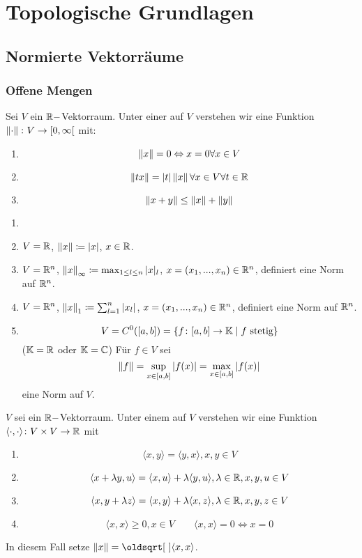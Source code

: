 \chapter{Topologische Grundlagen}
\section{Normierte Vektorr\"aume}
\subsection{Offene Mengen}
\begin{definition}
	Sei $ V $ ein $ \mathbb{R}- $Vektorraum. Unter einer  auf $ V $ verstehen wir eine Funktion $ \left\|\cdot\right\|\colon V\rightarrow [0,\infty[ $ mit:
	\begin{enumerate}
		\item[(N1)] \[ \left\|x\right\|=0\Leftrightarrow x=0\forall x\in V \]
		\item[(N2)] \[ \left\|tx\right\|=|t|\left\|x\right\|\forall x\in V\forall t\in\mathbb{R} \]
		\item[(N3)] \[ \left\|x+y\right\|\leq\left\|x\right\|+\left\|y\right\| \]
	\end{enumerate}
\end{definition}
\begin{beispiel*}
	\begin{enumerate}
		\item[]
		\item $ V=\mathbb{R} $, $ \left\|x\right\|\coloneqq|x| $, $ x\in\mathbb{R} $.
		\item $ V=\mathbb{R}^n $, $ \left\|x\right\|_\infty\coloneqq\max_{1\leq l\leq n}|x|_l $, $ x=(x_1,...,x_n)\in\mathbb{R}^n $, definiert eine Norm auf $ \mathbb{R}^n $.
		\item $ V=\mathbb{R}^n $, $ \left\|x\right\|_1\coloneqq\sum_{l=1}^n|x_l| $, $ x=(x_1,...,x_n)\in\mathbb{R}^n $, definiert eine Norm auf $ \mathbb{R}^n $.
		\item \[ V=C^0([a,b])=\lbrace f\colon[a,b]\rightarrow\mathbb{K}\mid f\text{ stetig}\rbrace \]
		($ \mathbb{K}=\mathbb{R} $ oder $ \mathbb{K}=\mathbb{C} $) F\"ur $ f\in V $ sei \[ \left\|f\right\|=\sup_{x\in[a,b]} |f(x)|=\max_{x\in[a,b]}|f(x)| \]
		eine Norm auf $ V $.
	\end{enumerate}
\end{beispiel*}
\begin{definition}
	$ V $ sei ein $ \mathbb{R}- $Vektorraum. Unter einem  auf $ V $ verstehen wir eine Funktion $ \langle\cdot,\cdot\rangle\colon V\times V\rightarrow\mathbb{R} $ mit
	\begin{enumerate}
		\item \[ \langle x,y\rangle=\langle y,x\rangle, x,y\in V \]
		\item \[ \langle x+\lambda y, u\rangle=\langle x,u\rangle+\lambda\langle y,u\rangle,\lambda\in\mathbb{R}, x,y,u\in V \]
		\item \[ \langle x,y+\lambda z\rangle=\langle x,y\rangle+\lambda\langle x,z\rangle,\lambda\in\mathbb{R}, x,y,z\in V \]
		\item \[ \langle x,x\rangle\geq 0, x\in V\qquad \langle x,x\rangle=0\Leftrightarrow x=0 \]
	\end{enumerate}
	In diesem Fall setze $ \norm{x}=\sqrt{\langle x,x\rangle} $.
\end{definition}
